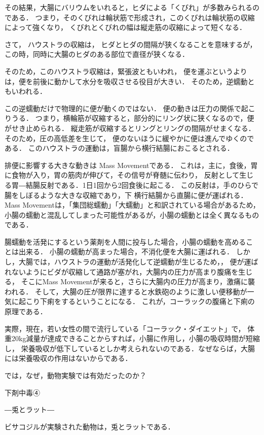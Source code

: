 その結果，大腸にバリウムをいれると，ヒダによる「くびれ」が多数みられるのである． 
つまり，そのくびれは輪状筋で形成され，このくびれは輪状筋の収縮によって強くなり，
くびれとくびれの幅は縦走筋の収縮によって短くなる． 

さて，
ハウストラの収縮は，
ヒダとヒダの間隔が狭くなることを意味するが，
この時，同時に大腸のヒダのある部位で直径が狭くなる．

そのため，このハウストラ収縮は，緊張波ともいわれ，
便を運ぶというよりは，便を前後に動かして水分を吸収させる役目が大きい．
そのため，逆蠕動ともいわれる．

この逆蠕動だけで物理的に便が動くのではない．
便の動きは圧力の関係で起こりうる．
つまり，横輪筋が収縮すると，部分的にリング状に狭くなるので，便がせき止められる．
縦走筋が収縮するとリングとリングの間隔がせまくなる．そのため，圧の高低差を生じて，
便のないほうに緩やかに便は進んでゆくのである． 
このハウストラの運動は，盲腸から横行結腸におこるとされる．

排便に影響する大きな動きは
Mass Movementである．
これは，主に，食後，胃に食物が入り，胃の筋肉が伸びて，その信号が脊髄に伝わり，
反射として生じる胃―結腸反射である．1日1回から2回食後に起こる．
この反射は，手のひらで腸をしぼるような大きな収縮であり，下 横行結腸から直腸に便が運ばれる．
Mass Movementは，「集団総蠕動」「大蠕動」と和訳されている場合があるため，
小腸の蠕動と混乱してしまった可能性があるが，小腸の蠕動とは全く異なるものである．

腸蠕動を活発にするという薬剤を人間に投与した場合，小腸の蠕動を高めることは出来る．
小腸の蠕動が高まった場合，不消化便を大腸に運ばれる．
しかし，大腸では，ハウストラの運動が活発化して逆蠕動が生じるため，，
便が運ばれないようにビダが収縮して通路が塞がれ，大腸内の圧力が高まり腹痛を生じる，
そこにMass Movementが来ると，さらに大腸内の圧力が高まり，激痛に襲われる．
そして，大腸の圧が限界に達すると水鉄砲のように激しい便移動が一気に起こり下痢をするということになる．
これが，コーラックの腹痛と下痢の原理である．

実際，現在，若い女性の間で流行している「コーラック・ダイエット」で，
体重20kg減量が達成できることからすれば，小腸に作用し，小腸の吸収時間が短縮し，
栄養吸収が低下しているとしか考えられないのである．なぜならば，大腸には栄養吸収の作用はないからである．

では，なぜ，動物実験では有効だったのか？

下剤中毒④

―兎とラット―

ビサコジルが実験された動物は，兎とラットである． 




